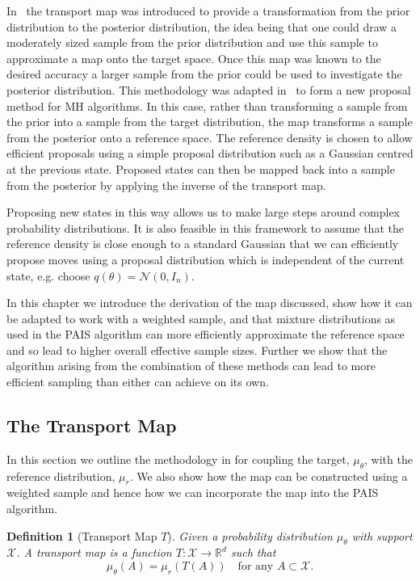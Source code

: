 \documentclass[final]{siamltex}
\newtheorem{dfn}{Definition}[section]
\begin{document}
In~\cite{el2012bayesian} the transport map was introduced to provide a transformation from the prior
distribution to the posterior distribution, the idea being that one could draw a moderately sized
sample from the prior distribution and use this sample to approximate a map onto the target space.
Once this map was known to the desired accuracy a larger sample from the prior could be used to
investigate the posterior distribution. This
methodology was adapted in~\cite{parno2014transport} to form a new proposal method for MH
algorithms. In this case, rather than transforming a sample from the prior into a sample from the target
distribution, the map transforms a sample from the posterior onto a reference space.
The reference density is chosen to allow efficient proposals using a simple proposal
distribution such as a Gaussian centred at the previous state. Proposed states can then be mapped back into a sample from the posterior by applying the inverse of the transport map.

Proposing new states in this way allows us to make large steps around complex probability distributions.
It is also feasible in this framework to assume that the reference density is close enough to a standard Gaussian that we can efficiently propose moves using a proposal distribution which is independent of the current state, e.g. choose $q(\theta) = \mathcal{N}(0,I_n)$.

In this chapter we introduce the derivation of the map discussed, show how it can be adapted to work
with a weighted sample, and that mixture distributions as used in the PAIS algorithm can more
efficiently approximate the reference space and so lead to higher overall effective sample sizes.
Further we show that the algorithm arising from the combination of these methods can lead to more
efficient sampling than either can achieve on its own.

\subsection{The Transport Map}

In this section we outline the methodology in \cite{parno2014transport} for coupling the target,
$\mu_{\theta}$, with the reference distribution, $\mu_r$.
We also show how the map can be constructed using a weighted sample and hence how we can incorporate the map into the PAIS algorithm.

\begin{dfn}[Transport Map $T$]
	Given a probability distribution $\mu_\theta$ with support $\mathcal{X}$.
	A transport map is a function $T\colon \mathcal{X} \rightarrow \mathbb{R}^d$ such that
	\[
		\mu_\theta(A) = \mu_r(T(A)) \quad \text{for any } A \subset \mathcal{X}.
	\]
\end{dfn}
\end{document}
